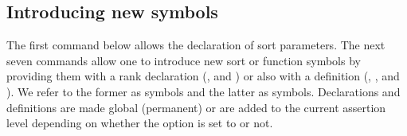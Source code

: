 \subsection{Introducing new symbols} \label{sec:new-symbols}

The first command below allows the declaration of sort parameters.
The next seven commands allow one to introduce new sort or function symbols 
by providing them with a rank declaration
(,  and )
or also with a definition 
(, ,  and 
).
We refer to the former as  symbols and 
the latter as  symbols.
Declarations and definitions are made global (permanent) or are added 
to the current assertion level depending on 
whether the option  is set to  or not.

